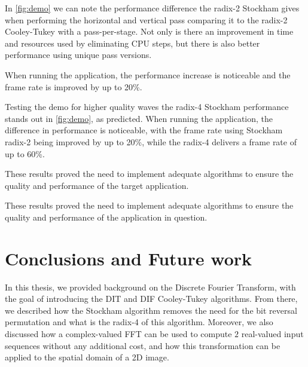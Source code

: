 \documentclass[
  oneside,
  11pt, a4paper,
  footinclude=true,
  headinclude=true,
  cleardoublepage=empty
]{scrbook}
\begin{document}
In \autoref{fig:demo} we can note the performance difference the radix-2 Stockham gives when performing the horizontal and vertical pass comparing it to the radix-2 Cooley-Tukey with a pass-per-stage. Not only is there an improvement in time and resources used by eliminating CPU steps, but there is also better performance using unique pass versions.

When running the application, the performance increase is noticeable and the frame rate is improved by up to 20\%.



Testing the demo for higher quality waves the radix-4 Stockham performance stands out in \autoref{fig:demo}, as predicted. When running the application, the difference in performance is noticeable, with the frame rate using Stockham radix-2 being improved by up to 20\%, while the radix-4 delivers a frame rate of up to 60\%.

These results proved the need to implement adequate algorithms to ensure the quality and performance of the target application.

These results proved the need to implement adequate algorithms to ensure the quality and performance of the application in question.

\chapter{Conclusions and Future work} \label{chap:conclusions-and-future-work}

In this thesis, we provided background on the Discrete Fourier Transform, with the goal of introducing the DIT and DIF Cooley-Tukey algorithms. From there, we described how the Stockham algorithm removes the need for the bit reversal permutation and what is the radix-4 of this algorithm. Moreover, we also discussed how a complex-valued FFT can be used to compute $2$ real-valued input sequences without any additional cost, and how this transformation can be applied to the spatial domain of a 2D image.
\end{document}
